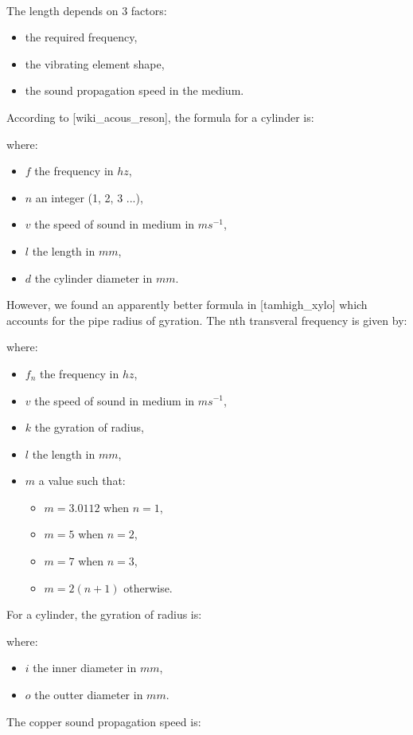 \documentclass[12pt]{article}
\begin{document}
\paragraph{} The length depends on 3 factors:
\begin{itemize}
  \item the required frequency,
  \item the vibrating element shape,
  \item the sound propagation speed in the medium.
\end{itemize}
According to [wiki\_acous\_reson], the formula for a cylinder is:
\begin{center}
\end{center}
where:
\begin{itemize}
  \item $f$ the frequency in $hz$,
  \item $n$ an integer (1, 2, 3 ...),
  \item $v$ the speed of sound in medium in $ms^{-1}$,
  \item $l$ the length in $mm$,
  \item $d$ the cylinder diameter in $mm$.
\end{itemize}
However, we found an apparently better formula in [tamhigh\_xylo]
which accounts for the pipe radius of gyration. The nth transveral frequency is
given by:
\begin{center}
\end{center}
where:
\begin{itemize}
  \item $f_{n}$ the frequency in $hz$,
  \item $v$ the speed of sound in medium in $ms^{-1}$,
  \item $k$ the gyration of radius,
  \item $l$ the length in $mm$,
  \item $m$ a value such that:
    \begin{itemize}
      \item $m = 3.0112$ when $n = 1$,
      \item $m = 5$ when $n = 2$,
      \item $m = 7$ when $n = 3$,
      \item $m = 2(n + 1)$ otherwise.
    \end{itemize}
\end{itemize}
For a cylinder, the gyration of radius is:
\begin{center}
\end{center}
where:
\begin{itemize}
  \item $i$ the inner diameter in $mm$,
  \item $o$ the outter diameter in $mm$.
\end{itemize}
The copper sound propagation speed is:
\begin{center}
\end{center}
\end{document}
